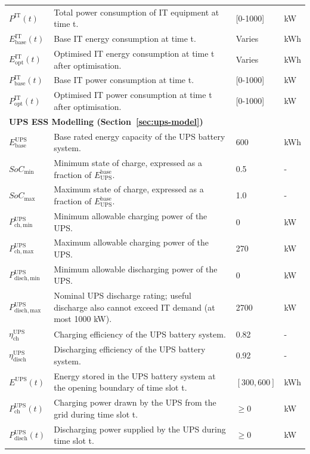 \documentclass[lettersize,journal]{IEEEtran}
\begin{document}
{{\begin{longtable}{p{} p{} p{} p{}}
$P^{\mathrm{IT}}(t)$ & Total power consumption of IT equipment at time t. & [0-1000] &kW \\
$E^{\mathrm{IT}}_{\mathrm{base}}(t)$ & Base IT energy consumption at time t. & Varies &kWh \\
$E^{\mathrm{IT}}_{\mathrm{opt}}(t)$ & Optimised IT energy consumption at time t after optimisation. & Varies &kWh \\
$P^{\mathrm{IT}}_{\mathrm{base}}(t)$ & Base IT power consumption at time t. & [0-1000] &kW \\
$P^{\mathrm{IT}}_{\mathrm{opt}}(t)$ & Optimised IT power consumption at time t after optimisation. & [0-1000] &kW \\

\midrule
\multicolumn{4}{l}{\textbf{UPS ESS Modelling (Section~\ref{sec:ups-model})}} \\
\midrule
$E^{\mathrm{UPS}}_{\mathrm{base}}$ & Base rated energy capacity of the UPS battery system. & 600 &kWh \\
$SoC_{\min}$ & Minimum state of charge, expressed as a fraction of $E_{\mathrm{UPS}}^{\mathrm{base}}$. & 0.5 & - \\
$SoC_{\max}$ & Maximum state of charge, expressed as a fraction of $E_{\mathrm{UPS}}^{\mathrm{base}}$. & 1.0 & - \\
$P^{\mathrm{UPS}}_{\mathrm{ch,min}}$ & Minimum allowable charging power of the UPS. & 0 &kW \\
$P^{\mathrm{UPS}}_{\mathrm{ch,max}}$ & Maximum allowable charging power of the UPS. & 270 &kW \\
$P^{\mathrm{UPS}}_{\mathrm{disch,min}}$ & Minimum allowable discharging power of the UPS. & 0 &kW \\
$P^{\mathrm{UPS}}_{\mathrm{disch,max}}$ & Nominal UPS discharge rating; useful discharge also cannot exceed IT demand (at most 1000 kW). & 2700 &kW \\
$\eta^{\mathrm{UPS}}_{\mathrm{ch}}$ & Charging efficiency of the UPS battery system. & 0.82 & - \\
$\eta^{\mathrm{UPS}}_{\mathrm{disch}}$ & Discharging efficiency of the UPS battery system. & 0.92 & - \\
$E^{\mathrm{UPS}}(t)$ & Energy stored in the UPS battery system at the opening boundary of time slot t. & $[300, 600]$ &kWh \\
$P^{\mathrm{UPS}}_{\mathrm{ch}}(t)$ & Charging power drawn by the UPS from the grid during time slot t. & $\geq 0$ &kW \\
$P^{\mathrm{UPS}}_{\mathrm{disch}}(t)$ & Discharging power supplied by the UPS during time slot t. & $\geq 0$ &kW \\

\end{longtable}}}
\end{document}
